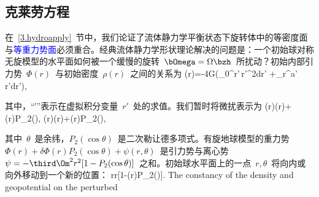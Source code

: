 \subsection{克莱劳方程}
%

在~\ref{3.hydroapply}~节中，我们论证了流体静力学平衡状态下旋转体中的等密度面与\textcolor{blue}{等重力势面}必须重合。经典流体静力学形状理论解决的问题是：一个初始球对称无旋模型的水平面如何被一个缓慢的旋转~$\bOmega=\Omega\bzh$~所扰动？初始内部引力势~$\Phi(r)$~与初始密度~$\rho(r)$~之间的关系为
\eq \label{14.unPhi}
\Phi(r)=-4\pi G\left(\int_0^r\rho'\,{r'}^2dr'
+\int_r^a\rho'\,r'dr'\right),
\en

其中，“′”表示在虚拟积分变量~$r'$~处的求值。我们暂时将微扰表示为
\eq \label{14.rhopert}
\rho(r)\rightarrow\rho(r)+\delta\hspace{-0.2 mm}\rho(r)P_2(\cos\theta),
\en
\eq
\Phi(r)\rightarrow\Phi(r)+\delta\Phi(r)P_2(\cos\theta),
\label{eq:14.geop}
\en

其中~$\theta$~是余纬，$P_2(\cos\theta)$~是二次勒让德多项式。有旋地球模型的重力势~$\Phi(r)+\delta\Phi(r)P_2(\cos\theta) +\psi(r,\theta)$~是引力势与离心势~$\psi=-\third\Om^2r^2[1-P_2(\cos\theta)]$~之和。初始球水平面上的一点~$r,\theta$~将向内或向外移动到一个新的位置：
\eq \label{14.rpert}
r\rightarrow r[1-\twothirds\eps(r)P_2(\cos\theta)].
\en
\iffalse
The constancy of the density and geopotential on the perturbed
